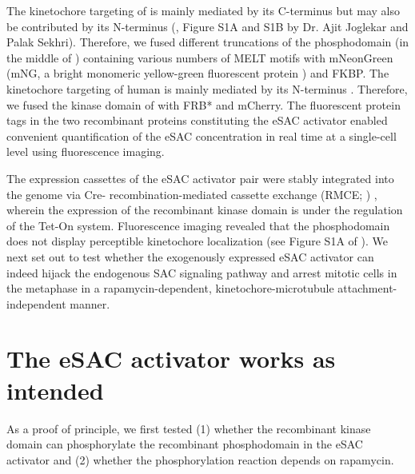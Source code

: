 The kinetochore targeting of  is mainly mediated by its C-terminus \cite{KNL1CTer_Kiyomitsu2007, Screpanti2011, Knl1CTer, MIS12CStructure_Petrovic2016, Spc105pCTer-MIND_Maskell2010} but may also be contributed by its N-terminus (\cite{eSAC}, Figure S1A and S1B by Dr. Ajit Joglekar and Palak Sekhri). Therefore, we fused different truncations of the  phosphodomain (in the middle of ) containing various numbers of MELT motifs with mNeonGreen (mNG, a bright monomeric yellow-green fluorescent protein \cite{mNG}) and FKBP. The kinetochore targeting of human  is mainly mediated by its N-terminus \cite{MPS1Localization_Ji, MPS1Localization_Hiruma, Mps1_Aravamudhan}. Therefore, we fused the kinase domain of  with FRB* \cite{FRB_T2098L} and mCherry. The fluorescent protein tags in the two recombinant proteins constituting the eSAC activator enabled convenient quantification of the eSAC concentration in real time at a single-cell level using fluorescence imaging.

The expression cassettes of the eSAC activator pair were stably integrated into the genome via Cre- recombination-mediated cassette exchange (RMCE; ) \cite{HeLa-A12_Khandelia2011, HeLa-A12_Ballister2014}, wherein the expression of the recombinant  kinase domain is under the regulation of the Tet-On system. Fluorescence imaging revealed that the  phosphodomain does not display perceptible kinetochore localization (see Figure S1A of \cite{eSAC}). We next set out to test whether the exogenously expressed eSAC activator can indeed hijack the endogenous SAC signaling pathway and arrest mitotic cells in the metaphase in a rapamycin-dependent, kinetochore-microtubule attachment-independent manner.

\section{The eSAC activator works as intended}

As a proof of principle, we first tested (1) whether the recombinant  kinase domain can phosphorylate the recombinant  phosphodomain in the eSAC activator and (2) whether the phosphorylation reaction depends on rapamycin.

